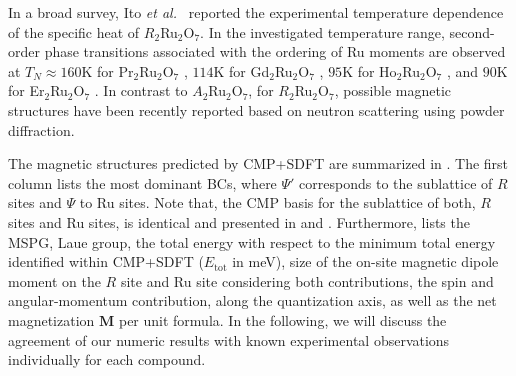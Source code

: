 \documentclass[10pt]{iopart}
\begin{document}
In a broad survey, Ito \emph{et al.\ }\cite{ito2001nature} reported the experimental temperature dependence of the specific heat of $R_2$Ru$_2$O$_7$. In the investigated temperature range, second-order phase transitions associated with the ordering of Ru moments are observed at $T_N\approx160$K for Pr$_2$Ru$_2$O$_7$ \cite{taira1999magnetic,ito2001nature,tachibana2007heat,van2017induced}, $114$K for Gd$_2$Ru$_2$O$_7$ \cite{ito2001nature,gurgul2007bulk}, $95$K for Ho$_2$Ru$_2$O$_7$ \cite{ito2001nature,wiebe2004magnetic}, and $90$K for Er$_2$Ru$_2$O$_7$ \cite{ito2001nature,taira2003magnetic}. In contrast to $A_2$Ru$_2$O$_7$, for $R_2$Ru$_2$O$_7$, possible magnetic structures have been recently reported based on neutron scattering using powder diffraction.

The magnetic structures predicted by CMP+SDFT are summarized in . The first column lists the most dominant BCs, where $\Psi'$ corresponds to the sublattice of $R$ sites and $\Psi$ to Ru sites. Note that, the CMP basis for the sublattice of both, $R$ sites and Ru sites, is identical and presented in  and . Furthermore,  lists the MSPG, Laue group, the total energy with respect to the minimum total energy identified within CMP+SDFT ($E_{\mathrm{tot}}$ in meV), size of the on-site magnetic dipole moment on the $R$ site and Ru site considering both contributions, the spin and angular-momentum contribution, along the quantization axis,
as well as the net magnetization $\mathbf{M}$ per unit formula. 
In the following, we will discuss the agreement of our numeric results with known experimental observations individually for each compound.
\end{document}

